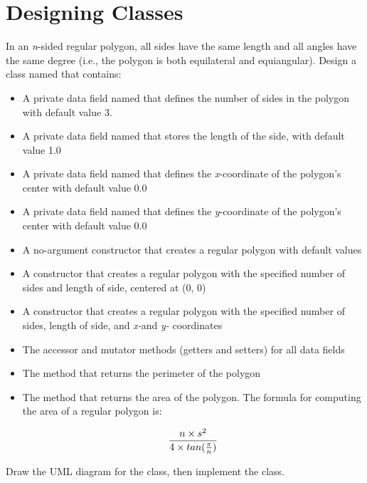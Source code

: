 \chapter{Designing Classes}

\begin{exercise}

In an {\em n}-sided regular polygon, all sides have the same length and all angles have the same degree (i.e., the polygon is both equilateral and equiangular). Design a class named  that contains:
\begin{itemize}
    \item A private  data field named  that defines the number of sides in the polygon with default value 3.
    \item A private  data field named  that stores the length of the side, with default value 1.0
    \item A private  data field named  that defines the {\em x}-coordinate of the polygon's center with default value 0.0
    \item A private  data field named  that defines the {\em y}-coordinate of the polygon's center with default value 0.0
    \item A no-argument constructor that creates a regular polygon with default values
    \item A constructor that creates a regular polygon with the specified number of sides and length of side, centered at (0, 0)
    \item A constructor that creates a regular polygon with the specified number of sides, length of side, and {\em x-}and {\em y-} coordinates
    \item The accessor and mutator methods (getters and setters) for all data fields
    \item The method  that returns the perimeter of the polygon
    \item The method  that returns the area of the polygon. The formula for computing the area of a regular polygon is:
    
    \begin{equation*}
    {{n \times s^2} \over {4 \times tan({\pi \over n})}}
    \end{equation*}
    
\end{itemize}

Draw the UML diagram for the class, then implement the class.


\end{exercise}
